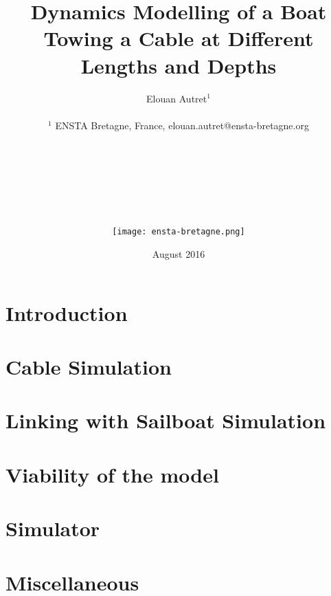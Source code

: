 \documentclass[twoside,12pt]{report} %
\title{ Dynamics Modelling of a Boat Towing a Cable at Different Lengths and Depths }
\author{Elouan Autret$^{1}$\\
\\
\normalsize{$^{1}$ ENSTA Bretagne, France, elouan.autret@ensta-bretagne.org}\\\\\\\\\\\\\\\\
\texttt{[image: ensta-bretagne.png]}
}
\date{August 2016}
\begin{document}
\renewcommand{\contentsname}{Contents}	%
\renewcommand{\bibname}{Bibliography}	%




\tableofcontents  %

\chapter*{Introduction}

\chapter{Cable Simulation}


\chapter{Linking with Sailboat Simulation}


\chapter{Viability of the model}


\chapter{Simulator}



\chapter{Miscellaneous}

\end{document}
